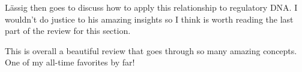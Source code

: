 L\"{a}ssig then goes to discuss how to apply this relationship to regulatory
DNA. I wouldn't do justice to his amazing insights so I think is worth reading
the last  part of the review for this section.

This is overall a beautiful review that goes through so many amazing concepts.
One of my all-time favorites by far!


